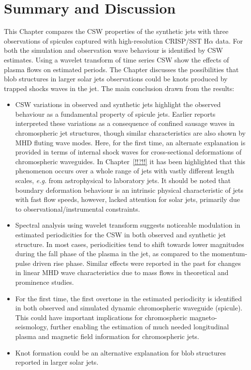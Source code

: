 \documentclass[12pt]{ociamthesis}
\begin{document}
\section{Summary and Discussion}
\label{sec:sum}
This Chapter compares the CSW properties of the synthetic jets with three observations of spicules captured with high-resolution CRISP/SST H$\alpha$ data. For both the simulation and observation wave behaviour is identified by CSW estimates. Using a wavelet transform of time series CSW show the effects of plasma flows on estimated periods. The Chapter discusses the possibilities that blob structures in larger solar jets observations could be knots produced by trapped shocks waves in the jet. The main conclusion drawn from the results:
\begin{itemize}
    \item{CSW variations in observed and synthetic jets highlight the observed behaviour as a fundamental property of spicule jets. Earlier reports interpreted these variations as a consequence of confined sausage waves in chromospheric jet structures, though similar characteristics are also shown by MHD fluting wave modes. Here, for the first time, an alternate explanation is provided in terms of internal shock waves for cross-sectional deformations of chromospheric waveguides. In Chapter~\ref{!!?!!} it has been highlighted that this phenomenon occurs over a whole range of jets with vastly different length scales, \textit{e.g.} from astrophysical to laboratory jets. It should be noted that boundary deformation behaviour is an intrinsic physical characteristic of jets with fast flow speeds, however, lacked attention for solar jets, primarily due to observational/instrumental constraints.}

    \item{Spectral analysis using wavelet transform suggests noticeable modulation in estimated periodicities for the CSW in both observed and synthetic jet structure. In most cases, periodicities tend to shift towards lower magnitudes during the fall phase of the plasma in the jet, as compared to the momentum-pulse driven rise phase. Similar effects were reported in the past for changes in linear MHD wave characteristics due to mass flows in theoretical and prominence studies.}

    \item{For the first time, the first overtone in the estimated periodicity is identified in both observed and simulated dynamic chromospheric waveguide (spicule). This could have important implications for chromospheric magneto-seismology, further enabling the estimation of much needed longitudinal plasma and magnetic field information for chromospheric jets.}
    
    \item{Knot formation could be an alternative explanation for blob structures reported in larger solar jets.}
\end{itemize}
\end{document}
